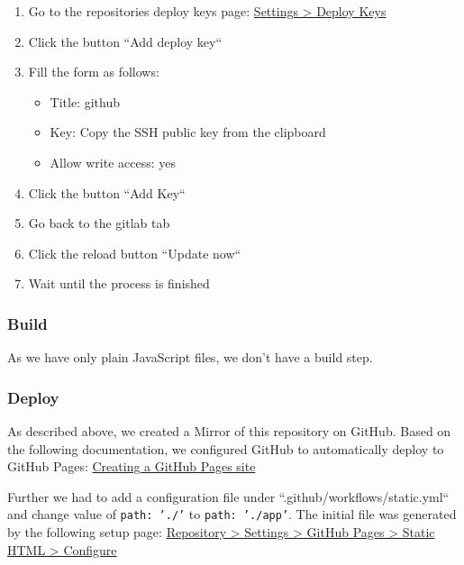 \begin{enumerate}
    \item Go to the repositories deploy keys page: \href{https://github.com/decibel-threshold-event-displayer/decibel-threshold-event-displayer.github.io/settings/keys}{Settings > Deploy Keys}
    \item Click the button ``Add deploy key``
    \item Fill the form as follows:
          \begin{itemize}
              \item Title: github
              \item Key: Copy the SSH public key from the clipboard
              \item Allow write access: yes
          \end{itemize}
    \item Click the button ``Add Key``
    \item Go back to the gitlab tab
    \item Click the reload button ``Update now``
    \item Wait until the process is finished
\end{enumerate}

\subsubsection{Build}
As we have only plain JavaScript files, we don't have a build step.

\subsubsection{Deploy}
As described above, we created a Mirror of this repository on GitHub.
Based on the following documentation, we configured GitHub to automatically deploy to GitHub Pages:
\href{https://docs.github.com/en/pages/getting-started-with-github-pages/creating-a-github-pages-site}{Creating a GitHub Pages site}

Further we had to add a configuration file under ``.github/workflows/static.yml`` and change value of \texttt{path: './'} to \texttt{path: './app'}.
The initial file was generated by the following setup page:
\href{https://github.com/decibel-threshold-event-displayer/decibel-threshold-event-displayer.github.io/new/main?filename=.github%2Fworkflows%2Fstatic.yml&pages_workflow_template=pages%2Fstatic}{Repository > Settings > GitHub Pages > Static HTML > Configure}

